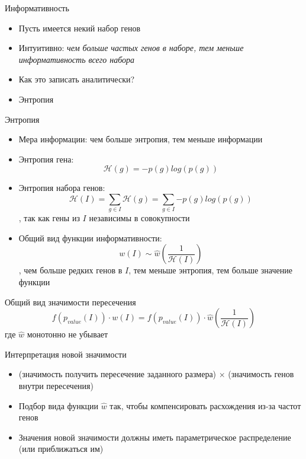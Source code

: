 \documentclass[10pt,pdf,utf8,russian,aspectratio=169]{beamer}
\begin{document}
\begin{frame}{Информативность}
    \begin{itemize}[<+->]
        \item Пусть имеется некий набор генов
	    \item Интуитивно: \emph{чем больше частых генов в наборе, тем меньше информативность всего набора}
	    \item Как это записать аналитически?
	    \item Энтропия
	 \end{itemize}
\end{frame}

\begin{frame}{Энтропия}
    \begin{itemize}[<+->]
        \item Мера информации: чем больше энтропия, тем меньше информации
        \item Энтропия гена:
            $$\mathcal{H}(g) = -p(g) log(p(g))$$
	    \item Энтропия набора генов:
	        $$\mathcal{H}(I) = \sum\limits_{g \in I}{\mathcal{H}(g)} = \sum\limits_{g \in I}{-p(g) log(p(g))}$$,
	        так как гены из $I$ независимы в совокупности
	    \item Общий вид функции информативности:
	        $$w(I) \sim \hat{w}(\frac{1}{\mathcal{H}(I)})$$,
	        чем больше редких генов в $I$, тем меньше энтропия, тем больше значение функции
	 \end{itemize}
\end{frame}

\begin{frame}{Общий вид значимости пересечения}
    \begin{equation}
        f(p_{value}(I)) \cdot w(I) = f(p_{value}(I)) \cdot \hat{w}(\frac{1}{\mathcal{H}(I)})
    \end{equation}
    где $\hat{w}$ монотонно не убывает
\end{frame}

\begin{frame}{Интерпретация новой значимости}
    \begin{itemize}[<+->]
        \item (значимость получить пересечение заданного размера) $\times$ (значимость генов внутри пересечения)
	    \item Подбор вида функции $\hat{w}$ так, чтобы компенсировать расхождения из-за частот генов
	    \item Значения новой значимости должны иметь параметрическое распределение (или приближаться им)
	 \end{itemize}
\end{frame}
\end{document}
